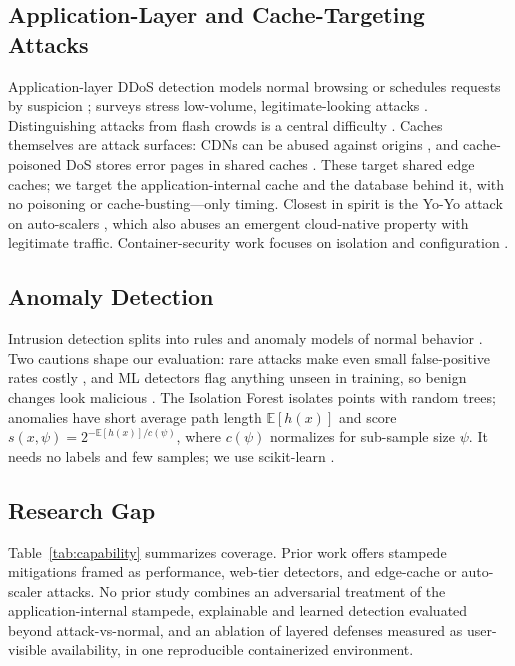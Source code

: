 \documentclass[journal]{IEEEtran}
\begin{document}
\subsection{Application-Layer and Cache-Targeting Attacks}
Application-layer DDoS detection models normal browsing \cite{xie2009} or schedules
requests by suspicion \cite{ranjan2009}; surveys stress low-volume, legitimate-looking
attacks \cite{praseed2019}. Distinguishing attacks from flash crowds is a central
difficulty \cite{jung2002,kandula2005}. Caches themselves are attack surfaces: CDNs
can be abused against origins \cite{triukose2009,guo2020}, and cache-poisoned DoS
stores error pages in shared caches \cite{nguyen2019}. These target shared edge caches;
we target the application-internal cache and the database behind it, with no poisoning
or cache-busting---only timing. Closest in spirit is the Yo-Yo attack on auto-scalers
\cite{sides2016,bremlerbarr2017}, which also abuses an emergent cloud-native property
with legitimate traffic. Container-security work focuses on isolation and configuration
\cite{combe2016,sultan2019,merkel2014,pahl2015,burns2016,dragoni2017}.

\subsection{Anomaly Detection}
Intrusion detection splits into rules and anomaly models of normal behavior
\cite{denning1987,chandola2009,hodge2004}. Two cautions shape our evaluation: rare
attacks make even small false-positive rates costly \cite{axelsson2000}, and
ML detectors flag anything unseen in training, so benign changes look malicious
\cite{sommer2010}. The Isolation Forest \cite{liu2008,liu2012} isolates points with
random trees; anomalies have short average path length $\mathbb{E}[h(x)]$ and score
$s(x,\psi)=2^{-\mathbb{E}[h(x)]/c(\psi)}$, where $c(\psi)$ normalizes for sub-sample
size $\psi$. It needs no labels and few samples; we use scikit-learn
\cite{pedregosa2011}.

\subsection{Research Gap}
Table~\ref{tab:capability} summarizes coverage. Prior work offers stampede mitigations
framed as performance, web-tier detectors, and edge-cache or auto-scaler attacks. No
prior study combines an adversarial treatment of the application-internal stampede,
explainable and learned detection evaluated beyond attack-vs-normal, and an ablation of
layered defenses measured as user-visible availability, in one reproducible
containerized environment.
\end{document}
